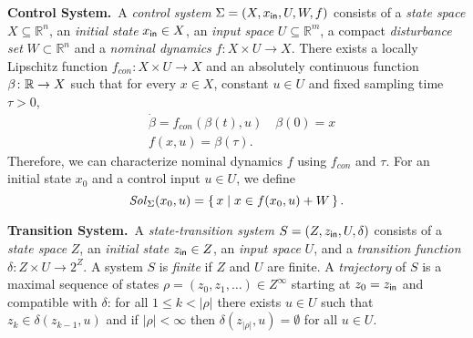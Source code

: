 \smallskip
\noindent\textbf{Control System.}\
A \emph{control system} $\Sigma = (X, x_{\mathsf{in}}, U, W, f)$
consists of a \emph{state space} $X\subseteq \mathbb{R}^n$,
an \emph{initial state} $x_{\mathsf{in}}\in X$,
 an \emph{input space} $U\subseteq\mathbb{R}^m$, 
a compact \emph{disturbance set} $W\subset \mathbb{R}^n$ and
a \emph{nominal dynamics} $f:X\times U\rightarrow X$. There exists a locally Lipschitz function $f_{con}\colon X\times U\rightarrow X$ and an absolutely continuous function $\beta\colon \mathbb{R} \rightarrow X$ such that for every $x\in X$, constant $u\in U$ and fixed sampling time $\tau>0$, 
\begin{align}
	&\dot \beta = f_{con}(\beta(t),u) \quad \beta(0) =x\nonumber\\
	 &f(x,u) =\beta(\tau).\label{eq:cont_to_disc}
\end{align}
Therefore, we can characterize nominal dynamics $f$ using $f_{con}$ and $\tau$. %
For an initial state $x_0$ and a control input $u\in U$, we define
\begin{equation}\label{equ:def_f}
	\mathit{Sol}_\Sigma(x_0,u)=\set{x\mid x\in f(x_0,u) + W}. 
\end{equation} 
%

\smallskip
\noindent\textbf{Transition System.}\
A \emph{state-transition system} $S=(Z,z_{\mathsf{in}},U,\delta)$ consists of a \emph{state space} $Z$, an \emph{initial state} $z_{\mathsf{in}}\in Z$, an \emph{input space} $U$, and a \emph{transition function} $\delta:Z\times U \rightarrow 2^Z$. 
A system $S$ is \emph{finite} if $Z$ and $U$ are finite. 
A \emph{trajectory} of $S$ is a maximal sequence of states $\rho = (z_0,z_1,\ldots) \in Z^\infty$ starting at $z_0=z_{\mathsf{in}}$ and compatible with $\delta$:
for all $1\leq k < |\rho|$ there exists $u\in U$ such that $z_k\in \delta(z_{k-1},u)$ and 
if $|\rho| < \infty$ then $\delta(z_{|\rho|},u)= \emptyset$ for all $u\in U$.

